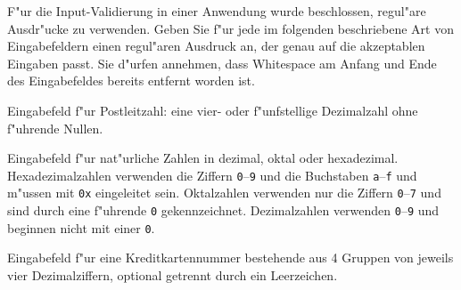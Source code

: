 F"ur die Input-Validierung in einer Anwendung wurde beschlossen,
regul"are Ausdr"ucke zu verwenden.
Geben Sie f"ur jede im folgenden beschriebene Art von Eingabefeldern
einen regul"aren Ausdruck an, der genau auf die akzeptablen Eingaben passt.
Sie d"urfen annehmen, dass Whitespace am Anfang und Ende des Eingabefeldes
bereits entfernt worden ist.
\begin{teilaufgaben}
\item Eingabefeld f"ur Postleitzahl: eine vier- oder f"unfstellige Dezimalzahl
ohne f"uhrende Nullen.
\item Eingabefeld f"ur nat"urliche Zahlen in dezimal, oktal oder hexadezimal.
Hexadezimalzahlen verwenden die Ziffern \texttt{0}--\texttt{9} und die
Buchstaben \texttt{a}--\texttt{f} und m"ussen mit \texttt{0x} eingeleitet
sein.
Oktalzahlen verwenden nur die Ziffern \texttt{0}--\texttt{7} und sind
durch eine f"uhrende \texttt{0} gekennzeichnet.
Dezimalzahlen verwenden \texttt{0}--\texttt{9} und beginnen nicht mit einer
\texttt{0}.
\item Eingabefeld f"ur eine Kreditkartennummer bestehende aus 4 Gruppen
von jeweils vier Dezimalziffern, optional getrennt durch ein Leerzeichen.
\end{teilaufgaben}

